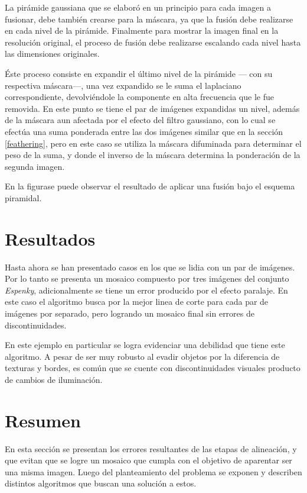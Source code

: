 La pirámide gaussiana que se elaboró en un principio para cada imagen a fusionar, debe también crearse para la máscara, ya que la fusión debe realizarse en cada nivel de la pirámide. Finalmente para mostrar la imagen final en la resolución original, el proceso de fusión debe realizarse escalando cada nivel hasta las dimensiones originales.

Éste proceso consiste en expandir el último nivel de la pirámide --- con su respectiva máscara---, una vez expandido se le suma el laplaciano correspondiente, devolviéndole la componente en alta frecuencia que le fue removida. En este punto se tiene el par de imágenes expandidas un nivel, además de la máscara aun afectada por el efecto del filtro gaussiano, con lo cual se efectúa una suma ponderada entre las dos imágenes similar que en la sección \ref{feathering}, pero en este caso se utiliza la máscara difuminada para determinar el peso de la suma, y donde el inverso de la máscara determina la ponderación de la segunda imagen.

En la figurase puede observar el resultado de aplicar una fusión bajo el esquema piramidal.


\section{Resultados}


Hasta ahora se han presentado casos en los que se lidia con un par de imágenes. Por lo tanto se presenta un mosaico compuesto por tres imágenes del conjunto \textit{Espenky}, adicionalmente se tiene un error producido por el efecto paralaje. En este caso el algoritmo busca por la mejor linea de corte para cada par de imágenes por separado, pero logrando un mosaico final sin errores de discontinuidades.

En este ejemplo en particular se logra evidenciar una debilidad que tiene este algoritmo. A pesar de ser muy robusto al evadir objetos por la diferencia de texturas y bordes, es común que se cuente con discontinuidades visuales producto de cambios de iluminación.


\section{Resumen}

En esta sección se presentan los errores resultantes de las etapas de alineación, y que evitan que se logre un  mosaico que cumpla con el objetivo de aparentar ser una misma imagen. Luego del planteamiento del problema se exponen y describen distintos algoritmos que buscan una solución a estos.

